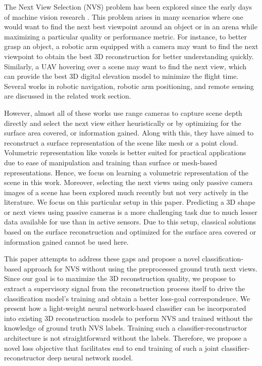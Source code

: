 The Next View Selection (NVS) problem has been explored since the early days of machine vision research \cite{connolly1985determination}.
This problem arises in many scenarios where one would want to find the next best viewpoint around an object or in an arena while maximizing a particular quality or performance metric.
For instance, to better grasp an object, a robotic arm equipped with a camera may want to find the next viewpoint to obtain the best 3D reconstruction for better understanding quickly.
Similarly, a UAV hovering over a scene may want to find the next view, which can provide the best 3D digital elevation model to minimize the flight time.
Several works in robotic navigation, robotic arm positioning, and remote sensing are discussed in the related work section.

However, almost all of these works use range cameras to capture scene depth directly and select the next view either heuristically or by optimizing for the surface area covered, or information gained.
Along with this, they have aimed to reconstruct a surface representation of the scene like mesh or a point cloud.
Volumetric representation like voxels is better suited for practical applications due to ease of manipulation and training than surface or mesh-based representations.
Hence, we focus on learning a volumetric representation of the scene in this work.
Moreover, selecting the next views using only passive camera images of a scene has been explored much recently but not very actively in the literature. We focus on this particular setup in this paper.
Predicting a 3D shape or next views using passive cameras is a more challenging task due to much lesser data available for use than in active sensors.
Due to this setup, classical solutions based on the surface reconstruction and optimized for the surface area covered or information gained cannot be used here.

This paper attempts to address these gaps and propose a novel classification-based approach for NVS without using the preprocessed ground truth next views.
Since our goal is to maximize the 3D reconstruction quality, we propose to extract a supervisory signal from the reconstruction process itself to drive the classification model's training and obtain a better loss-goal correspondence.
We present how a light-weight neural network-based classifier can be incorporated into existing 3D reconstruction models to perform NVS and trained without the knowledge of ground truth NVS labels.
Training such a classifier-reconstructor architecture is not straightforward without the labels. Therefore, we propose a novel loss objective that facilitates end to end training of such a joint classifier-reconstructor deep neural network model.

